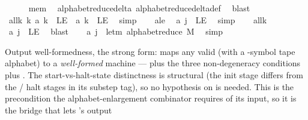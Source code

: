 \begin{isabellebody}
\ \ \ \ \isamarkupfalse%
\ mem\ \isamarkupfalse%
\ alphabet{\isacharunderscore}{\kern0pt}reduce{\isacharunderscore}{\kern0pt}delta\ alphabet{\isacharunderscore}{\kern0pt}reduce{\isacharunderscore}{\kern0pt}delta{\isacharunderscore}{\kern0pt}def\ \isamarkupfalse%
\ blast\isanewline
\ \ \isamarkupfalse%
\ allk{\isacharcolon}{\kern0pt}\ {\isachardoublequoteopen}{\isasymforall}k{\isachardot}{\kern0pt}\ a{\isacharprime}{\kern0pt}\ k\ {\isacharequal}{\kern0pt}\ LE{}\ {\isasymlongrightarrow}\ a\ k\ {\isacharequal}{\kern0pt}\ LE{}{\isachardoublequoteclose}\ \isamarkupfalse%
\ simp\isanewline
\ \ \isamarkupfalse%
\ a{\isacharprime}{\kern0pt}le\ \isamarkupfalse%
\ {\isachardoublequoteopen}a{\isacharprime}{\kern0pt}\ j\ {\isacharequal}{\kern0pt}\ LE{}{\isachardoublequoteclose}\ \isamarkupfalse%
\ simp\isanewline
\ \ \isamarkupfalse%
\ allk\ \isamarkupfalse%
\ {\isachardoublequoteopen}a\ j\ {\isacharequal}{\kern0pt}\ LE{}{\isachardoublequoteclose}\ \isamarkupfalse%
\ blast\isanewline
\ \ \isamarkupfalse%
\ {\isachardoublequoteopen}a\ j\ {\isacharequal}{\kern0pt}\ le{\isacharunderscore}{\kern0pt}tm\ {\isacharparenleft}{\kern0pt}alphabet{\isacharunderscore}{\kern0pt}reduce\ M{\isacharparenright}{\kern0pt}{\isachardoublequoteclose}\ \isamarkupfalse%
\ simp\isanewline
{}\isamarkupfalse%
%
\endisatagproof
{\isafoldproof}%
%
\isadelimproof
%
\endisadelimproof
%
\begin{isamarkuptext}%
Output well-formedness, the strong form: 
  maps any valid  (with a -symbol tape alphabet) to a
  \emph{well-formed} machine —  plus the three
  non-degeneracy conditions plus .  The
  start-vs-halt-state distinctness is structural (the
   init stage differs from the 
  /  halt stages in its substep tag), so no
   hypothesis on  is needed.  This is the
  precondition the alphabet-enlargement combinator requires of its
  input, so it is the bridge that lets 's output

\end{isamarkuptext}
\end{isabellebody}
